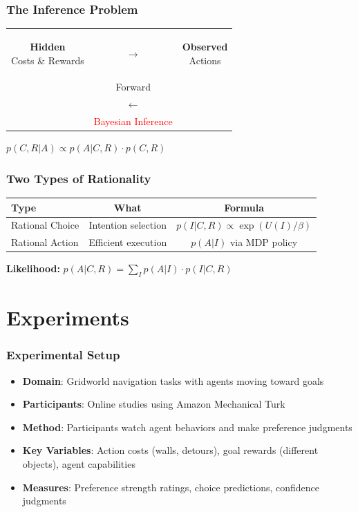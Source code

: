 \documentclass{beamer}
\begin{document}
\begin{frame}
\frametitle{The Inference Problem}
\begin{center}
\begin{tabular}{c c c}
\colorbox{blue!20}{\parbox{2.5cm}{\centering \textbf{Hidden} \\ Costs \& Rewards}} 
& $\longrightarrow$ & 
\colorbox{red!20}{\parbox{2.5cm}{\centering \textbf{Observed} \\ Actions}} \\
& Forward & \\
& $\longleftarrow$ & \\
& \textcolor{red}{Bayesian Inference} & \\
\end{tabular}

\vspace{0.8cm}
$p(C,R|A) \propto p(A|C,R) \cdot p(C,R)$
\end{center}
\end{frame}

\begin{frame}
\frametitle{Two Types of Rationality}
\begin{center}
\begin{tabular}{|l|c|c|}
\hline
\textbf{Type} & \textbf{What} & \textbf{Formula} \\
\hline
Rational Choice & Intention selection & $p(I|C,R) \propto \exp(U(I)/\beta)$ \\
\hline
Rational Action & Efficient execution & $p(A|I)$ via MDP policy \\
\hline
\end{tabular}

\vspace{0.8cm}
\textbf{Likelihood:} $p(A|C,R) = \sum_I p(A|I) \cdot p(I|C,R)$
\end{center}
\end{frame}

\section{Experiments}
\begin{frame}
\frametitle{Experimental Setup}
\begin{itemize}
    \item \textbf{Domain}: Gridworld navigation tasks with agents moving toward goals
    \item \textbf{Participants}: Online studies using Amazon Mechanical Turk
    \item \textbf{Method}: Participants watch agent behaviors and make preference judgments
    \item \textbf{Key Variables}: Action costs (walls, detours), goal rewards (different objects), agent capabilities
    \item \textbf{Measures}: Preference strength ratings, choice predictions, confidence judgments
\end{itemize}
\end{frame}
\end{document}
